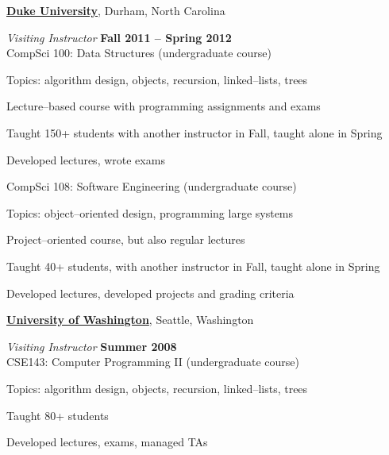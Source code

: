 \documentclass[10pt]{article}
\newenvironment{outerlist}[1][\enskip\textbullet]%
        {\begin{itemize}[#1]}{\end{itemize}%
         \vspace{-.6\baselineskip}}
\newenvironment{innerlist}[1][\enskip\textbullet]%
        {\begin{compactitem}[#1]}{\end{compactitem}}
\newcommand{\blankline}{\quad\pagebreak[2]}
\begin{document}
\href{http://www.duke.edu}{\textbf{Duke University}},
Durham, North Carolina
\begin{outerlist}
\item[] \textit{Visiting Instructor}%
    \hfill \textbf{Fall 2011 -- Spring 2012}\\
    CompSci 100: Data Structures (undergraduate course)
    \begin{innerlist}
    \item Topics: algorithm design, objects, recursion, linked--lists, trees
    \item Lecture--based course with programming assignments and exams
    \item Taught 150+ students with another instructor in Fall, taught alone in Spring
    \item Developed lectures, wrote exams
    \end{innerlist}

    CompSci 108: Software Engineering (undergraduate course)
    \begin{innerlist}
    \item Topics: object--oriented design, programming large systems
    \item Project--oriented course, but also regular lectures
    \item Taught 40+ students, with another instructor in Fall, taught alone in Spring
    \item Developed lectures, developed projects and grading criteria
    \end{innerlist}

\end{outerlist}

\blankline

\href{http://www.uw.edu}{\textbf{University of Washington}},
Seattle, Washington
\begin{outerlist}
\item[] \textit{Visiting Instructor}%
    \hfill \textbf{Summer 2008}\\
    CSE143: Computer Programming II (undergraduate course)
    \begin{innerlist}
    \item Topics: algorithm design, objects, recursion, linked--lists, trees
    \item Taught 80+ students
    \item Developed lectures, exams, managed TAs
    \end{innerlist}
\end{outerlist}
\end{document}
